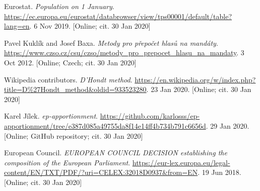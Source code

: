 \documentclass[a4paper]{article}
\theoremstyle{definition}
\begin{document}
\begin{thebibliography}{9}
    Eurostat. \textit{Population on 1 January}. \url{https://ec.europa.eu/eurostat/databrowser/view/tps00001/default/table?lang=en}. 6 Nov 2019. [Online; cit. 30 Jan 2020]
    
    Pavel Kuklík and Josef Baxa. \textit{Metody pro přepočet hlasů na mandáty}. \url{https://www.czso.cz/csu/czso/metody_pro_prepocet_hlasu_na_mandaty}. 3 Oct 2012. [Online; Czech; cit. 30 Jan 2020]
    
    Wikipedia contributors. \textit{D'Hondt method}. \url{https://en.wikipedia.org/w/index.php?title=D%27Hondt_method&oldid=933523280}. 23 Jan 2020. [Online; cit. 30 Jan 2020]
    	
   	Karel Jílek. \textit{ep-apportionment}. \url{https://github.com/karlosss/ep-apportionment/tree/e387d085a49755da8f14e14ff4b734b791c6656d}. 29 Jan 2020. [Online; GitHub repository; cit. 30 Jan 2020]
   	
   	European Council. \textit{EUROPEAN COUNCIL DECISION establishing the composition of the European Parliament}. \url{https://eur-lex.europa.eu/legal-content/EN/TXT/PDF/?uri=CELEX:32018D0937&from=EN}. 19 Jun 2018. [Online; cit. 30 Jan 2020]

\end{thebibliography}
\end{document}
